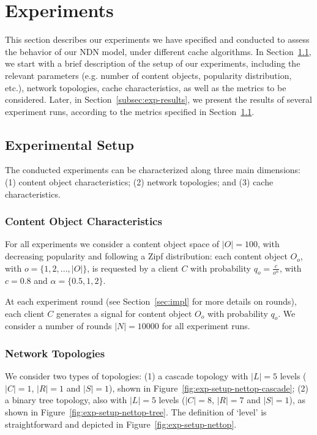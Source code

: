 \section{Experiments}
\label{sec:experiments}

This section describes our experiments we have specified and conducted to assess 
the behavior of 
our NDN model, under different cache algorithms. In 
Section~\ref{subsec:exp-setup}, we start 
with a brief description of the setup of our experiments, 
including the relevant parameters (e.g. number of content objects, popularity 
distribution, etc.), network topologies, cache characteristics, as well as the 
metrics to be considered. Later, in Section~\ref{subsec:exp-results}, we 
present the results of several experiment runs, according to the metrics 
specified in Section~\ref{subsec:exp-setup}.

\subsection{Experimental Setup}
\label{subsec:exp-setup}

The conducted experiments can be characterized along three main dimensions: (1) 
content object characteristics; (2) network topologies; and (3) cache 
characteristics.\shortvertbreak

\subsubsection{Content Object Characteristics}
\label{subsec:exp-setup-cobj}

For all experiments we consider a content object space of 
$|O| = 100$, with decreasing popularity and following a Zipf distribution: 
each content object $O_o$, with $o = \{1,2,...,|O|\}$, is requested by a client 
$C$ with probability $q_{o} = \frac{c}{o^{\alpha}}$, with $c = 0.8$ and 
$\alpha = \{0.5, 1, 2\}$.\shortvertbreak

At each experiment round (see Section~\ref{sec:impl} for more details on 
rounds), each client $C$ generates a signal for content object $O_o$ with 
probability $q_{o}$. We consider a number of rounds 
$|N| = 10000$ for all experiment runs.\shortvertbreak

\subsubsection{Network Topologies}
\label{subsec:exp-setup-nettop}

We consider two types of topologies: (1) a cascade topology with $|L| = 5$ levels 
($|C| = 1$, $|R| = 1$ and $|S| = 1$), shown in Figure~\ref{fig:exp-setup-nettop-cascade}; (2) a binary 
tree topology, also with $|L| = 5$ levels ($|C| = 8$, $|R| = 7$ and $|S| = 1$), as 
shown in Figure~\ref{fig:exp-setup-nettop-tree}. The definition of `level' is straightforward and depicted 
in Figure~\ref{fig:exp-setup-nettop}.\shortvertbreak

